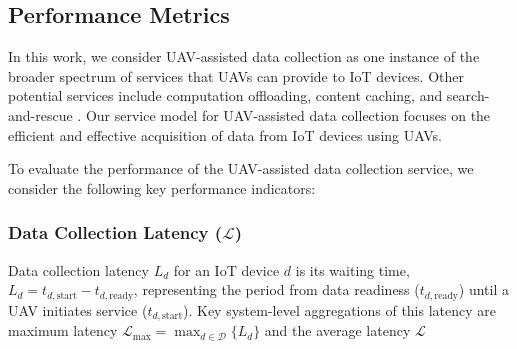 \documentclass[10pt,conference,letterpaper]{IEEEtran}
\begin{document}
\subsection{Performance Metrics}
\label{subsec:performance_metrics}
In this work, we consider UAV-assisted data collection as one instance of the broader spectrum of services that UAVs can provide to IoT devices. Other potential services include computation offloading, content caching, and search-and-rescue \cite{DBLP:conf/infocom/Sun0HM0024,DBLP:journals/jsac/ZhengZJ24,DBLP:journals/tmc/SoorkiAABCS25}. Our service model for UAV-assisted data collection focuses on the efficient and effective acquisition of data from IoT devices using UAVs.


To evaluate the performance of the UAV-assisted data collection service, we consider the following key performance indicators:



\subsubsection{Data Collection Latency ($\mathcal{L}$)}
Data collection latency $L_d$ for an IoT device $d$ is its waiting time, $L_d = t_{d,\text{start}} - t_{d,\text{ready}}$, representing the period from data readiness ($t_{d,\text{ready}}$) until a UAV initiates service ($t_{d,\text{start}}$). Key system-level aggregations of this latency are maximum latency $\mathcal L_{\text{max}} = \max_{d \in \mathcal{D}} \{L_d\}$ and the average latency $\mathcal{L}$
\end{document}
